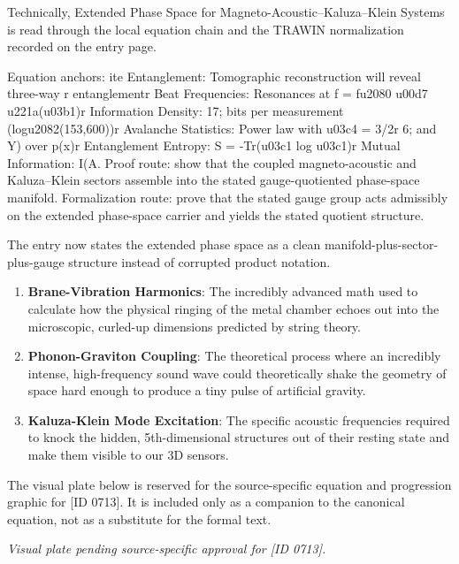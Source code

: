 Technically, Extended Phase Space for Magneto-Acoustic--Kaluza--Klein Systems is read through the local equation chain and the TRAWIN normalization recorded on the entry page.

Equation anchors: ite Entanglement: Tomographic reconstruction will reveal three-way r entanglementr Beat Frequencies: Resonances at f = fu2080 u00d7 u221a(u03b1)r Information Density: 17; bits per measurement (logu2082(153,600))r Avalanche Statistics: Power law with u03c4 = 3/2r 6; and Y) over p(x)r Entanglement Entropy: S = -Tr(u03c1 log u03c1)r Mutual Information: I(A. Proof route: show that the coupled magneto-acoustic and Kaluza--Klein sectors assemble into the stated gauge-quotiented phase-space manifold. Formalization route: prove that the stated gauge group acts admissibly on the extended phase-space carrier and yields the stated quotient structure.

The entry now states the extended phase space as a clean manifold-plus-sector-plus-gauge structure instead of corrupted product notation.
\endgroup

\begin{enumerate}[leftmargin=1.6em,itemsep=6pt,topsep=4pt]
\item \textbf{Brane-Vibration Harmonics}: The incredibly advanced math used to calculate how the physical ringing of the metal chamber echoes out into the microscopic, curled-up dimensions predicted by string theory.
\item \textbf{Phonon-Graviton Coupling}: The theoretical process where an incredibly intense, high-frequency sound wave could theoretically shake the geometry of space hard enough to produce a tiny pulse of artificial gravity.
\item \textbf{Kaluza-Klein Mode Excitation}: The specific acoustic frequencies required to knock the hidden, 5th-dimensional structures out of their resting state and make them visible to our 3D sensors.
\end{enumerate}

\begingroup\footnotesize\sloppy
The visual plate below is reserved for the source-specific equation and progression graphic for [ID 0713]. It is included only as a companion to the canonical equation, not as a substitute for the formal text.
\par\endgroup
\begingroup\footnotesize\itshape
Visual plate pending source-specific approval for [ID 0713].
\par\endgroup

